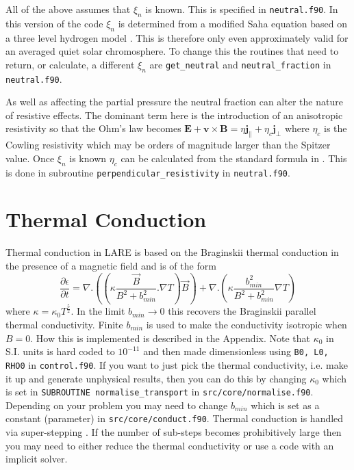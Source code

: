 \documentclass[11pt]{article}
\begin{document}
All of the above assumes that $\xi_n$ is known. This is specified in \texttt{neutral.f90}. In this version of the code $\xi_n$ is determined from a modified Saha equation based on a three level hydrogen model \cite{brown}. This is therefore only even approximately valid for an averaged quiet solar chromosphere. To change this the routines that need to return, or calculate, a different $\xi_n$ are \texttt{get\_neutral} and \texttt{neutral\_fraction} in \texttt{neutral.f90}. 

As well as affecting the partial pressure the neutral fraction can alter the nature of resistive effects. The dominant term here is the introduction of an anisotropic resistivity so that the Ohm's law becomes
$\mathbf{E}+\mathbf{v}\times\mathbf{B}=\eta \mathbf{j_{\parallel}} + \eta_c \mathbf{j_{\perp}}$
where $\eta_c$ is the Cowling resistivity which may be orders of magnitude larger than the Spitzer value. Once $\xi_n$ is known $\eta_c$ can be calculated from the standard formula in \cite{flux-emergence}. This is done in subroutine \texttt{perpendicular\_resistivity} in \texttt{neutral.f90}.

\section{Thermal Conduction} %
\label{sec:thermal_conduction}
Thermal conduction in LARE is based on the Braginskii thermal conduction in the presence of a magnetic field and is of the form\\
\[
\frac{\partial \epsilon}{\partial t} = \nabla . \left(\left(\kappa \frac{\vec{B}}{B^2+b_{min}^2}. \nabla T\right) \vec{B} \right) +  \nabla . \left(\kappa  \frac{b_{min}^2}{B^2+b_{min}^2}  \nabla T \right)
\]
where $\kappa = \kappa_0  T^\frac{5}{2}$. In the limit $b_{min}\to 0$ this recovers the Braginskii parallel thermal conductivity. Finite $b_{min}$ is used to make the conductivity isotropic when $B=0$.  How this is implemented is described in the Appendix. Note that $\kappa_0$ in S.I. units is hard coded to $10^{-11}$ and then made dimensionless using 
{\tt B0, L0, RHO0} in {\tt control.f90}. If you want to just pick the thermal conductivity, i.e. make it up and generate unphysical results, then you can do this by changing $\kappa_0$ which is set in {\tt SUBROUTINE normalise\_transport} in {\tt src/core/normalise.f90}. Depending on your problem you may need to change $b_{min}$ which is set as a constant (parameter) in {\tt src/core/conduct.f90}. Thermal conduction is handled via super-stepping \cite{Meyer:2012eb}. If the number of sub-steps becomes prohibitively large then you may need to either reduce the thermal conductivity or use a code with an implicit solver.
\end{document}
